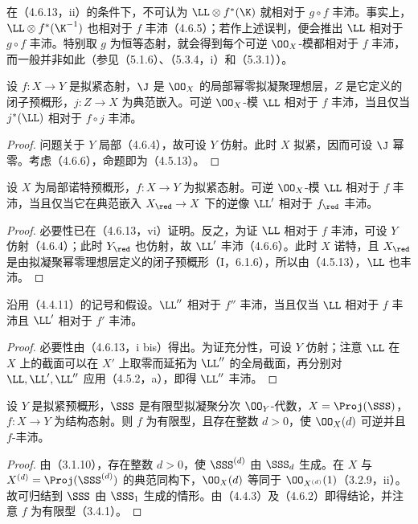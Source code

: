 在（4.6.13，ii）的条件下，不可认为 $\LL\otimes f^*(\K)$ 就相对于 $g\circ f$ 丰沛。事实上，$\LL\otimes f^*(\K^{-1})$ 也相对于 $f$ 丰沛（4.6.5）；若作上述误判，便会推出 $\LL$ 相对于 $g\circ f$ 丰沛。特别取 $g$ 为恒等态射，就会得到每个可逆 $\OO_X$-模都相对于 $f$ 丰沛，而一般并非如此（参见（5.1.6）、（5.3.4，i）和（5.3.1））。

设 $f:X\to Y$ 是拟紧态射，$\J$ 是 $\OO_X$ 的局部幂零拟凝聚理想层，$Z$ 是它定义的闭子预概形，$j:Z\to X$ 为典范嵌入。可逆 $\OO_X$-模 $\LL$ 相对于 $f$ 丰沛，当且仅当 $j^*(\LL)$ 相对于 $f\circ j$ 丰沛。
\begin{proof}
问题关于 $Y$ 局部（4.6.4），故可设 $Y$ 仿射。此时 $X$ 拟紧，因而可设 $\J$ 幂零。考虑（4.6.6），命题即为（4.5.13）。
\end{proof}

设 $X$ 为局部诺特预概形，$f:X\to Y$ 为拟紧态射。可逆 $\OO_X$-模 $\LL$ 相对于 $f$ 丰沛，当且仅当它在典范嵌入 $X_{\red}\to X$ 下的逆像 $\LL'$ 相对于 $f_{\red}$ 丰沛。
\begin{proof}
必要性已在（4.6.13，vi）证明。反之，为证 $\LL$ 相对于 $f$ 丰沛，可设 $Y$ 仿射（4.6.4）；此时 $Y_{\red}$ 也仿射，故 $\LL'$ 丰沛（4.6.6）。此时 $X$ 诺特，且 $X_{\red}$ 是由拟凝聚幂零理想层定义的闭子预概形（I，6.1.6），所以由（4.5.13），$\LL$ 也丰沛。
\end{proof}

沿用（4.4.11）的记号和假设。$\LL''$ 相对于 $f''$ 丰沛，当且仅当 $\LL$ 相对于 $f$ 丰沛且 $\LL'$ 相对于 $f'$ 丰沛。
\begin{proof}
必要性由（4.6.13，i bis）得出。为证充分性，可设 $Y$ 仿射；注意 $\LL$ 在 $X$ 上的截面可以在 $X'$ 上取零而延拓为 $\LL''$ 的全局截面，再分别对 $\LL,\LL',\LL''$ 应用（4.5.2，a），即得 $\LL''$ 丰沛。
\end{proof}

设 $Y$ 是拟紧预概形，$\SSS$ 是有限型拟凝聚分次 $\OO_Y$-代数，$X=\Proj(\SSS)$，$f:X\to Y$ 为结构态射。则 $f$ 为有限型，且存在整数 $d>0$，使 $\OO_X(d)$ 可逆并且 $f$-丰沛。
\begin{proof}
由（3.1.10），存在整数 $d>0$，使 $\SSS^{(d)}$ 由 $\SSS_d$ 生成。在 $X$ 与 $X^{(d)}=\Proj(\SSS^{(d)})$ 的典范同构下，$\OO_X(d)$ 等同于 $\OO_{X^{(d)}}(1)$（3.2.9，ii）。故可归结到 $\SSS$ 由 $\SSS_1$ 生成的情形。由（4.4.3）及（4.6.2）即得结论，并注意 $f$ 为有限型（3.4.1）。
\end{proof}

